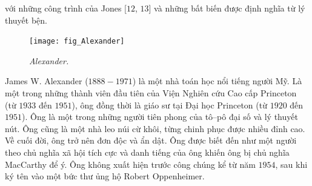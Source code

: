 \begin{multicols}{2}
	với những công trình của Jones [$12$, $13$] và những bất biến được định nghĩa từ lý thuyết bện.
	\vskip 0.01cm
	\begin{tBox}
		\begin{figure}
			\vspace*{-15pt}
			\centering
			\captionsetup{labelformat= empty, justification=centering}
			\hspace*{2pt}\texttt{[image: fig\_Alexander]}
			\caption{\small\textit{\color{duongvaotoanhoc}Alexander.}}
			\vspace*{-10pt}
		\end{figure}
		James W. Alexander ($1888-1971$) là một nhà toán học nổi tiếng người Mỹ. Là một trong những thành viên đầu tiên của Viện Nghiên cứu Cao cấp Princeton (từ $1933$ đến $1951$), ông đồng thời là giáo sư tại Đại học Princeton (từ $1920$ đến $1951$). Ông là một trong những người tiên phong của tô--pô đại số và lý thuyết nút. Ông cũng là một nhà leo núi cừ khôi, từng chinh phục được nhiều đỉnh cao. Về cuối đời, ông trở nên đơn độc và ẩn dật. Ông được biết đến như một người theo chủ nghĩa xã hội tích cực và danh tiếng của ông khiến ông bị chủ nghĩa MacCarthy để ý. Ông không xuất hiện trước công chúng kể từ năm $1954$, sau khi ký tên vào một bức thư ủng hộ Robert Oppenheimer.
	\end{tBox}
	

\end{multicols}
